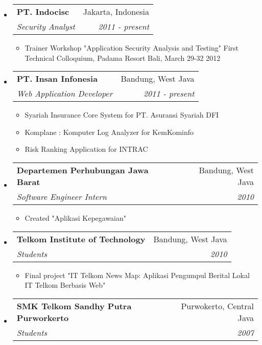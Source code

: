 \documentclass[letterpaper,11pt]{article}
\makeatletter
\newcommand{\resitem}[1]{\item #1 \vspace{-2pt}}
\newcommand{\ressubheading}[4]{

\begin{tabular*}{6.5in}{l@{\cftdotfill{\cftsecdotsep}\extracolsep{\fill}}r}

		\textbf{#1} & #2 \\

		\textit{#3} & \textit{#4} \\

\end{tabular*}\vspace{-6pt}}
\makeatother
\begin{document}
\begin{itemize}

\item

	\ressubheading{PT. Indocisc}{Jakarta, Indonesia}{Security Analyst}{2011 - present}

	\begin{itemize}

		\resitem{Trainer Workshop "Application Security Analysis and Testing" First Technical Colloquium, Padama Resort Bali, March 29-32 2012}

	\end{itemize}

\item

	\ressubheading{PT. Insan Infonesia}{Bandung, West Java}{Web Application Developer}{2011 - present}

	\begin{itemize}

		\resitem{Syariah Insurance Core System for PT. Asuransi Syariah DFI}

    	\resitem{Komplane : Komputer Log Analyzer for KemKominfo}

    	\resitem{Risk Ranking Application for INTRAC}

	\end{itemize}

\item

	\ressubheading{Departemen Perhubungan Jawa Barat}{Bandung, West Java}{Software Engineer Intern}{2010}

	\begin{itemize}

		\resitem{Created "Aplikasi Kepegawaian"}

	\end{itemize}

\item

	\ressubheading{Telkom Institute of Technology}{Bandung, West Java}{Students}{2010}

	\begin{itemize}

		\resitem{Final project "IT Telkom News Map: Aplikasi Pengumpul Berital Lokal IT Telkom Berbasis Web"}

	\end{itemize}

\item

	\ressubheading{SMK Telkom Sandhy Putra Purworkerto}{Purwokerto, Central Java}{Students}{2007}


\end{itemize}
\end{document}
